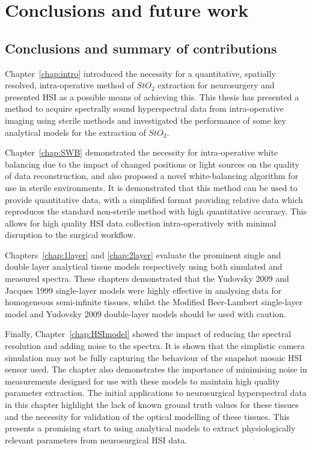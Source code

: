 \chapter{Conclusions and future work}
\label{chap:conclusion}
\minitoc
\section{Conclusions and summary of contributions}
Chapter~\ref{chap:intro} introduced the necessity for a quantitative, spatially resolved, intra-operative method of $StO_2$ extraction for neurosurgery and presented HSI as a possible means of achieving this. This thesis has presented a method to acquire spectrally sound hyperspectral data from intra-operative imaging using sterile methods and investigated the performance of some key analytical models for the extraction of $StO_2$. 

Chapter~\ref{chap:SWB} demonstrated the necessity for intra-operative white balancing due to the impact of changed positions or light sources on the quality of data reconstruction, and also proposed a novel white-balancing algorithm for use in sterile environments. It is demonstrated that this method can be used to provide quantitative data, with a simplified format providing relative data which reproduces the standard non-sterile method with high quantitative accuracy. This allows for high quality HSI data collection intra-operatively with minimal disruption to the surgical workflow. 

Chapters~\ref{chap:1layer} and \ref{chap:2layer} evaluate the prominent single and double layer analytical tissue models respectively using both simulated and measured spectra. These chapters demonstrated that the Yudovsky 2009 and Jacques 1999 single-layer models were highly effective in analysing data for homogeneous semi-infinite tissues, whilst the Modified Beer-Lambert single-layer model and Yudovsky 2009 double-layer models should be used with caution. 

Finally, Chapter~\ref{chap:HSImodel} showed the impact of reducing the spectral resolution and adding noise to the spectra. It is shown that the simplistic camera simulation may not be fully capturing the behaviour of the snapshot mosaic HSI sensor used. The chapter also demonstrates the importance of minimising noise in measurements designed for use with these models to maintain high quality parameter extraction. The initial applications to neurosurgical hyperspectral data in this chapter highlight the lack of known ground truth values for these tissues and the necessity for validation of the optical modelling of these tissues. This presents a promising start to using analytical models to extract physiologically relevant parameters from neurosurgical HSI data. 

